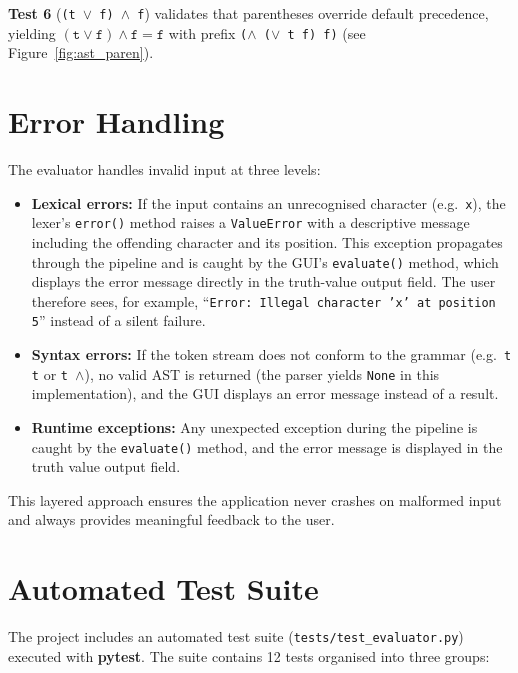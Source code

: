 \textbf{Test 6} (\texttt{(t $\vee$ f) $\wedge$ f}) validates that parentheses override default precedence, yielding $(\texttt{t} \vee \texttt{f}) \wedge \texttt{f} = \texttt{f}$ with prefix \texttt{($\wedge$ ($\vee$ t f) f)} (see Figure~\ref{fig:ast_paren}).

\section{Error Handling}

The evaluator handles invalid input at three levels:

\begin{itemize}
    \item \textbf{Lexical errors:} If the input contains an unrecognised character (e.g.\ \texttt{x}), the lexer's \texttt{error()} method raises a \texttt{ValueError} with a descriptive message including the offending character and its position.  This exception propagates through the pipeline and is caught by the GUI's \texttt{evaluate()} method, which displays the error message directly in the truth-value output field.  The user therefore sees, for example, ``\texttt{Error: Illegal character 'x' at position 5}'' instead of a silent failure.
    \item \textbf{Syntax errors:} If the token stream does not conform to the grammar (e.g.\ \texttt{t t} or \texttt{t $\wedge$}), no valid AST is returned (the parser yields \texttt{None} in this implementation), and the GUI displays an error message instead of a result.
    \item \textbf{Runtime exceptions:} Any unexpected exception during the pipeline is caught by the \texttt{evaluate()} method, and the error message is displayed in the truth value output field.
\end{itemize}

This layered approach ensures the application never crashes on malformed input and always provides meaningful feedback to the user.

\section{Automated Test Suite}

The project includes an automated test suite (\texttt{tests/test\_evaluator.py}) executed with \textbf{pytest}.  The suite contains 12 tests organised into three groups:

